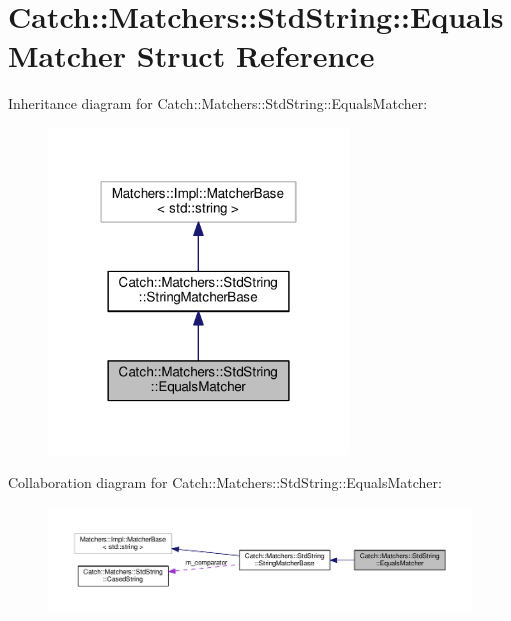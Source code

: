 \hypertarget{structCatch_1_1Matchers_1_1StdString_1_1EqualsMatcher}{}\section{Catch\+:\+:Matchers\+:\+:Std\+String\+:\+:Equals\+Matcher Struct Reference}
\label{structCatch_1_1Matchers_1_1StdString_1_1EqualsMatcher}


Inheritance diagram for Catch\+:\+:Matchers\+:\+:Std\+String\+:\+:Equals\+Matcher\+:\nopagebreak
\begin{figure}[H]
\begin{center}
\leavevmode
\includegraphics[width=226pt]{structCatch_1_1Matchers_1_1StdString_1_1EqualsMatcher__inherit__graph}
\end{center}
\end{figure}


Collaboration diagram for Catch\+:\+:Matchers\+:\+:Std\+String\+:\+:Equals\+Matcher\+:\nopagebreak
\begin{figure}[H]
\begin{center}
\leavevmode
\includegraphics[width=350pt]{structCatch_1_1Matchers_1_1StdString_1_1EqualsMatcher__coll__graph}
\end{center}
\end{figure}
